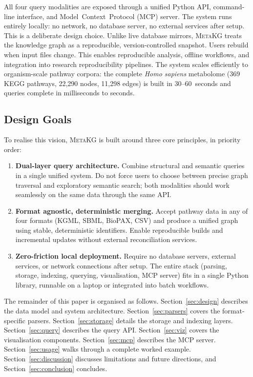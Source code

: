 \documentclass[10pt]{article}
\begin{document}
All four query modalities are exposed through a unified Python API,
command-line interface, and Model~Context~Protocol (MCP) server. The system
runs entirely locally: no network, no database server, no external services
after setup. This is a deliberate design choice. Unlike live database mirrors,
\textsc{MetaKG} treats the knowledge graph as a reproducible, version-controlled
snapshot. Users rebuild when input files change. This enables reproducible
analysis, offline workflows, and integration into research reproducibility pipelines.
The system scales efficiently to organism-scale pathway corpora: the complete
\textit{Homo sapiens} metabolome (369 KEGG pathways, 22,290 nodes, 11,298 edges)
is built in 30--60~seconds and queries complete in milliseconds to seconds.

\subsection{Design Goals}

To realise this vision, \textsc{MetaKG} is built around three core principles,
in priority order:

\begin{enumerate}[leftmargin=*, itemsep=2pt]
\item \textbf{Dual-layer query architecture.} Combine structural and semantic
  queries in a single unified system. Do not force users to choose between
  precise graph traversal and exploratory semantic search; both modalities
  should work seamlessly on the same data through the same API.

\item \textbf{Format agnostic, deterministic merging.} Accept pathway data in
  any of four formats (KGML, SBML, BioPAX, CSV) and produce a unified graph
  using stable, deterministic identifiers. Enable reproducible builds and
  incremental updates without external reconciliation services.

\item \textbf{Zero-friction local deployment.} Require no database servers,
  external services, or network connections after setup. The entire stack
  (parsing, storage, indexing, querying, visualisation, MCP server) fits in a
  single Python library, runnable on a laptop or integrated into batch
  workflows.
\end{enumerate}

The remainder of this paper is organised as follows. Section~\ref{sec:design}
describes the data model and system architecture. Section~\ref{sec:parsers}
covers the format-specific parsers. Section~\ref{sec:storage} details the
storage and indexing layers. Section~\ref{sec:query} describes the query API.
Section~\ref{sec:viz} covers the visualisation components.
Section~\ref{sec:mcp} describes the MCP server. Section~\ref{sec:usage}
walks through a complete worked example. Section~\ref{sec:discussion}
discusses limitations and future directions, and Section~\ref{sec:conclusion}
concludes.
\end{document}
